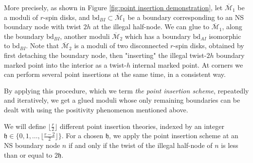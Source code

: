 \documentclass[11pt,a4paper]{article}
\theoremstyle{definition}
\theoremstyle{remark}
\numberwithin{equation}{section}
\def\Mbar{{\overline{\mathcal M}}}
\def\h{{\mathfrak h}}
\begin{document}
More precisely, as shown in Figure \ref{fig:point insertion demonstration}, let $\Mbar_1$ be a moduli of $r$-spin disks, and $\text{bd}_{BI}\subset \Mbar_1$ be a boundary corresponding to an NS boundary node with twist $2h$ at the illegal half-node. We can glue to $\Mbar_1$, along the boundary $\text{bd}_{BI}$, another moduli $\Mbar_2$ which has a boundary $\text{bd}_{AI}$ isomorphic to $\text{bd}_{BI}$. Note that $\Mbar_2$ is a moduli of two disconnected $r$-spin disks, obtained by first detaching the boundary node, then "inserting" the illegal twist-$2h$ boundary marked point into the interior as a twist-$h$ internal marked point. 
At corners we can perform several point insertions at the same time, in a consistent way.

By applying this procedure, which we term \emph{the point insertion scheme}, repeatedly and iteratively, we get a glued moduli whose only remaining boundaries can be dealt with using the positivity phenomenon mentioned above.

We will define $\lfloor \frac{r}{2}\rfloor$ different point insertion theories, indexed by an integer $\h\in \{0,1,\dots,\lfloor \frac{r-2}{2}\rfloor\}$. For a chosen $\h$, we apply the point insertion scheme at an NS boundary node $n$ if and only if the twist of the illegal half-node of $n$ is less than or equal to $2\h$.
\end{document}
